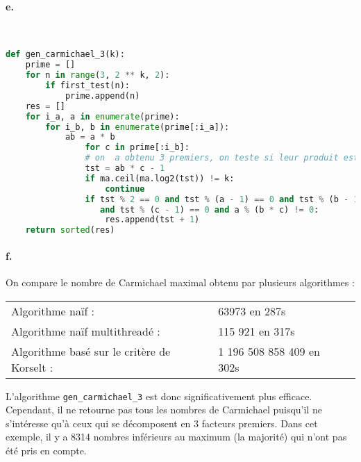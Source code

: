 \documentclass[french]{article}
\begin{document}
\paragraph{e.} \
\begin{lstlisting}[language=Python, belowskip=-1 \baselineskip]
def gen_carmichael_3(k):
    prime = []
    for n in range(3, 2 ** k, 2):
        if first_test(n):
            prime.append(n)
    res = []
    for i_a, a in enumerate(prime):
        for i_b, b in enumerate(prime[:i_a]):
            ab = a * b
                for c in prime[:i_b]:
                # on  a obtenu 3 premiers, on teste si leur produit est Carmichael
                tst = ab * c - 1
                if ma.ceil(ma.log2(tst)) != k:
                    continue
                if tst % 2 == 0 and tst % (a - 1) == 0 and tst % (b - 1) == 0 
                   and tst % (c - 1) == 0 and a % (b * c) != 0:
                    res.append(tst + 1)
    return sorted(res)
\end{lstlisting}
\paragraph{f.} On compare le nombre de Carmichael maximal obtenu par plusieurs algorithmes :\\
\begin{center}
    
    \begin{tabular}{lll}
        Algorithme naïf :&63973 en 287s\\
        Algorithme naïf multithreadé : & 115 921 en 317s\\
        Algorithme basé sur le critère de Korselt : &1 196 508 858 409 en 302s\\
    \end{tabular}
    
\end{center}
L'algorithme \verb*|gen_carmichael_3| est donc significativement plus efficace. Cependant, il ne retourne pas tous les nombres de Carmichael puisqu'il ne s'intéresse qu'à ceux qui se décomposent en 3 facteurs premiers. Dans cet exemple, il y a 8314 nombres inférieurs au maximum (la majorité) qui n'ont pas été pris en compte.
\end{document}
